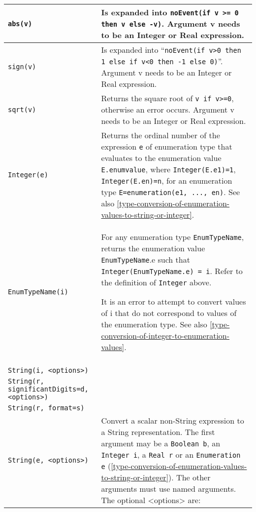 \begin{longtable}{|p{4.5cm}|p{10cm}|} \hline
\endhead
\lstinline!abs(v)! & Is expanded into \lstinline!noEvent(if v >= 0 then v else -v)!. Argument v needs to be an Integer or Real expression.\\ \hline
\lstinline!sign(v)! & Is expanded into ``\lstinline!noEvent(if v>0 then 1 else if v<0 then -1 else 0)!''. Argument v needs to be an Integer or Real
expression.\\ \hline
\lstinline!sqrt(v)! & Returns the square root of \lstinline!v if v>=0!, otherwise
an error occurs. Argument v needs to be an Integer or Real
expression.\\ \hline

\lstinline!Integer(e)! & Returns the ordinal number of the expression \lstinline!e! of
enumeration type that evaluates to the enumeration value \lstinline!E.enumvalue!,
where \lstinline!Integer(E.e1)=1!, \lstinline!Integer(E.en)=n!, for an enumeration type
\lstinline!E=enumeration(e1, ..., en)!. See also \autoref{type-conversion-of-enumeration-values-to-string-or-integer}.\\ \hline
\lstinline!EnumTypeName(i)! & 
For any enumeration type \lstinline!EnumTypeName!, returns the enumeration
value \lstinline!EnumTypeName!.e such that \lstinline!Integer(EnumTypeName.e) = i!. Refer to the definition of 
\lstinline!Integer! above.

It is an error to attempt to convert values of i that do not correspond
to values of the enumeration type. See also \autoref{type-conversion-of-integer-to-enumeration-values}.
\\ \hline

\begin{tabular}{@{}p{4.5cm}@{}}
\lstinline!String(b, <options>)!\\
\lstinline!String(i, <options>)!\\
\lstinline!String(r,!
\hspace*{1ex}\lstinline!significantDigits=d,!
\hspace*{1ex}\lstinline!<options>)!\\
\lstinline!String(r, format=s)!\\
\lstinline!String(e, <options>)!
\end{tabular} 
& 
Convert a scalar non-String expression to a String representation. The
first argument may be a \lstinline!Boolean b!, an \lstinline!Integer i!, a \lstinline!Real r! or an
\lstinline!Enumeration e! (\autoref{type-conversion-of-enumeration-values-to-string-or-integer}). The other arguments must use named
arguments. The optional \textless{}options\textgreater{} are:


\end{longtable}
